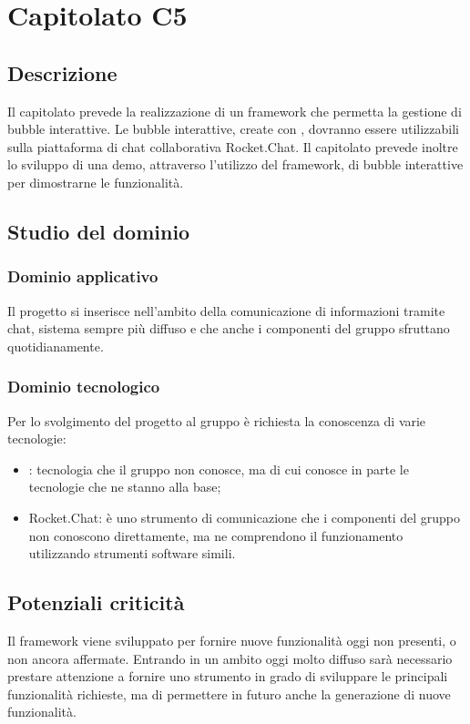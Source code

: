 \section{Capitolato C5}

\subsection{Descrizione}
Il capitolato prevede la realizzazione di un framework che permetta la gestione di bubble interattive. Le bubble interattive, create con \ProjectName, dovranno essere utilizzabili sulla piattaforma di chat collaborativa Rocket.Chat.
Il capitolato prevede inoltre lo sviluppo di una demo, attraverso l'utilizzo del framework, di bubble interattive per dimostrarne le funzionalità.

\subsection{Studio del dominio}
\subsubsection{Dominio applicativo}
Il progetto si inserisce nell'ambito della comunicazione di informazioni tramite chat, sistema sempre più diffuso e che anche i componenti del gruppo sfruttano quotidianamente.

\subsubsection{Dominio tecnologico}
Per lo svolgimento del progetto al gruppo è richiesta la conoscenza di varie tecnologie:
\begin{itemize}
	\item {}: tecnologia che il gruppo non conosce, ma di cui conosce in parte le tecnologie che ne stanno alla base;
	\item Rocket.Chat: è uno strumento di comunicazione che i componenti del gruppo non conoscono direttamente, ma ne comprendono il funzionamento utilizzando strumenti software simili.
\end{itemize}

\subsection{Potenziali criticità}
Il framework viene sviluppato per fornire nuove funzionalità oggi non presenti, o non ancora affermate. Entrando in un ambito oggi molto diffuso sarà necessario prestare attenzione a fornire uno strumento in grado di sviluppare le principali funzionalità richieste, ma di permettere in futuro anche la generazione di nuove funzionalità.

